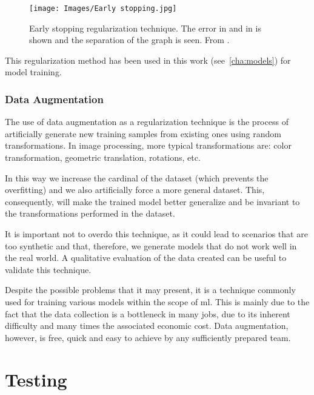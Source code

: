 \begin{figure}[ht]
  \centering
  \texttt{[image: Images/Early stopping.jpg]}
  \caption[Early stopping regularization technique]{Early stopping
    regularization technique. The error in  and in  is
    shown and the separation of the graph is seen. From
    .}%
  \label{fig:early}
\end{figure}

This regularization method has been used in this work (see\ \vref{cha:models})
for model training.

\subsubsection{Data Augmentation}

The use of data augmentation as a regularization technique is the process of
artificially generate new training samples from existing ones using random
transformations. In image processing, more typical
transformations are: color transformation, geometric translation, rotations,
etc.

In this way we increase the cardinal of the dataset (which prevents the
overfitting) and we also artificially force a more general dataset. This,
consequently, will make the trained model better generalize and be invariant to
the transformations performed in the dataset.

\begin{remarkBox}
  It is important not to overdo this technique, as it could lead to scenarios
  that are too synthetic and that, therefore, we generate models that do not
  work well in the real world. A qualitative evaluation of the data created can
  be useful to validate this technique.
\end{remarkBox}

Despite the possible problems that it may present, it is a technique commonly
used for training various models within the scope of \gls{ml}. This is mainly
due to the fact that the data collection is a bottleneck in many jobs, due to
its inherent difficulty and many times the associated economic cost. Data
augmentation, however, is free, quick and easy to achieve by any sufficiently
prepared team.


\section{Testing}\label{sec:testing}


